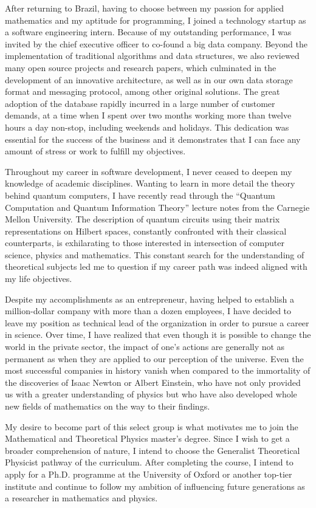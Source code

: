 \documentclass[10pt]{article}
\begin{document}
After returning to Brazil, having to choose between my passion for applied mathematics and my aptitude for programming, I joined a technology startup as a software engineering intern. Because of my outstanding performance, I was invited by the chief executive officer to co-found a big data company. Beyond the implementation of traditional algorithms and data structures, we also reviewed many open source projects and research papers, which culminated in the development of an innovative architecture, as well as in our own data storage format and messaging protocol, among other original solutions. The great adoption of the database rapidly incurred in a large number of customer demands, at a time when I spent over two months working more than twelve hours a day non-stop, including weekends and holidays. This dedication was essential for the success of the business and it demonstrates that I can face any amount of stress or work to fulfill my objectives.

Throughout my career in software development, I never ceased to deepen my knowledge of academic disciplines. Wanting to learn in more detail the theory behind quantum computers, I have recently read through the ``Quantum Computation and Quantum Information Theory'' lecture notes from the Carnegie Mellon University. The description of quantum circuits using their matrix representations on Hilbert spaces, constantly confronted with their classical counterparts, is exhilarating to those interested in intersection of computer science, physics and mathematics. This constant search for the understanding of theoretical subjects led me to question if my career path was indeed aligned with my life objectives.

Despite my accomplishments as an entrepreneur, having helped to establish a million-dollar company with more than a dozen employees, I have decided to leave my position as technical lead of the organization in order to pursue a career in science. Over time, I have realized that even though it is possible to change the world in the private sector, the impact of one's actions are generally not as permanent as when they are applied to our perception of the universe. Even the most successful companies in history vanish when compared to the immortality of the discoveries of Isaac Newton or Albert Einstein, who have not only provided us with a greater understanding of physics but who have also developed whole new fields of mathematics on the way to their findings.

My desire to become part of this select group is what motivates me to join the Mathematical and Theoretical Physics master's degree. Since I wish to get a broader comprehension of nature, I intend to choose the Generalist Theoretical Physicist pathway of the curriculum. After completing the course, I intend to apply for a Ph.D. programme at the University of Oxford or another top-tier institute and continue to follow my ambition of influencing future generations as a researcher in mathematics and physics.
\end{document}
